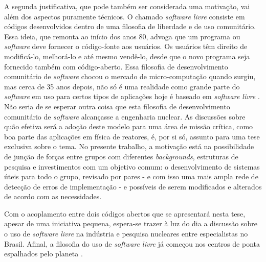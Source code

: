 A segunda justificativa, que pode também ser considerada uma motivação, vai além dos aspectos puramente técnicos.
O chamado \textit{software livre} consiste em códigos desenvolvidos dentro de uma filosofia de liberdade e de uso
comunitário. Essa ideia, que remonta ao início dos anos 80, advoga que um programa ou \textit{software} deve fornecer
o código-fonte aos usuários. Os usuários têm direito de modificá-lo, melhorá-lo e até mesmo vendê-lo, desde que o novo
programa seja fornecido também com código-aberto. Essa filosofia de desenvolvimento comunitário de \textit{software}
chocou o mercado de micro-computação quando surgiu, mas cerca de 35 anos depois, não só é uma realidade como
grande parte do \textit{software} em uso para certos tipos de aplicações hoje é baseado em \textit{software livre}
\cite{Androutsellis2010}. Não seria de se esperar outra coisa que esta filosofia de desenvolvimento comunitário de
\textit{software} alcançasse a engenharia nuclear. As discussões sobre quão efetiva será a adoção deste modelo
para uma área de missão crítica, como boa parte das aplicações em física de reatores, é, por si só, assunto para uma
tese exclusiva sobre o tema. No presente trabalho, a motivação está na possibilidade de junção de forças entre grupos com
diferentes \textit{backgrounds}, estruturas de pesquisa e investimentos com um objetivo comum: o desenvolvimento
de sistemas úteis para todo o grupo, revisado por pares - e com isso uma mais ampla rede de detecção de erros
de implementação - e possíveis de serem modificados e alterados de acordo com as necessidades.

Com o acoplamento entre dois códigos abertos que se apresentará nesta tese, apesar
de uma iniciativa pequena, espera-se trazer à luz do dia a discussão sobre o uso de \textit{software livre} na
indústria e pesquisa nucleares entre especialistas no Brasil. Afinal, a filosofia do uso de \textit{software livre}
já começou nos centros de ponta espalhados pelo planeta \cite{Romano2013, Boyd2014, Huff2016}.





